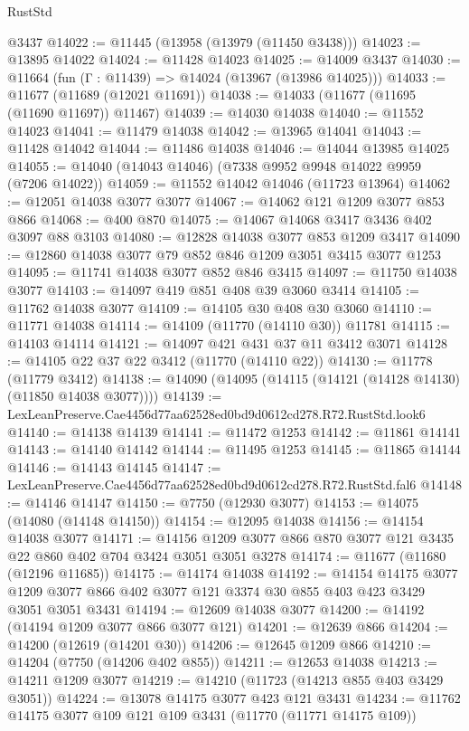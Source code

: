 \begin{lexlean}{RustStd}
\begin{coremodule}
    @3437
@14022 := @11445 (@13958 (@13979 (@11450 @3438)))
@14023 := @13895 @14022
@14024 := @11428 @14023
@14025 := @14009 @3437
@14030 := @11664 (fun (Γ : @11439) => @14024 (@13967 (@13986 @14025)))
@14033 := @11677 (@11689 (@12021 @11691))
@14038 := @14033 (@11677 (@11695 (@11690 @11697)) @11467)
@14039 := @14030 @14038
@14040 := @11552 @14023
@14041 := @11479 @14038
@14042 := @13965 @14041
@14043 := @11428 @14042
@14044 := @11486 @14038
@14046 := @14044 @13985 @14025
@14055 := @14040 (@14043 @14046) (@7338 @9952 @9948 @14022 @9959 (@7206 @14022))
@14059 := @11552 @14042 @14046 (@11723 @13964)
@14062 := @12051 @14038 @3077 @3077
@14067 := @14062 @121 @1209 @3077 @853 @866
@14068 := @400 @870
@14075 := @14067 @14068 @3417 @3436 @402 @3097 @88 @3103
@14080 := @12828 @14038 @3077 @853 @1209 @3417
@14090 := @12860 @14038 @3077 @79 @852 @846 @1209 @3051 @3415 @3077 @1253
@14095 := @11741 @14038 @3077 @852 @846 @3415
@14097 := @11750 @14038 @3077
@14103 := @14097 @419 @851 @408 @39 @3060 @3414
@14105 := @11762 @14038 @3077
@14109 := @14105 @30 @408 @30 @3060
@14110 := @11771 @14038
@14114 := @14109 (@11770 (@14110 @30)) @11781
@14115 := @14103 @14114
@14121 := @14097 @421 @431 @37 @11 @3412 @3071
@14128 := @14105 @22 @37 @22 @3412 (@11770 (@14110 @22))
@14130 := @11778 (@11779 @3412)
@14138 := @14090 (@14095 (@14115 (@14121 (@14128 @14130) (@11850 @14038 @3077))))
@14139 := LexLeanPreserve.Cae4456d77aa62528ed0bd9d0612cd278.R72.RustStd.look6
@14140 := @14138 @14139
@14141 := @11472 @1253
@14142 := @11861 @14141
@14143 := @14140 @14142
@14144 := @11495 @1253
@14145 := @11865 @14144
@14146 := @14143 @14145
@14147 := LexLeanPreserve.Cae4456d77aa62528ed0bd9d0612cd278.R72.RustStd.fal6
@14148 := @14146 @14147
@14150 := @7750 (@12930 @3077)
@14153 := @14075 (@14080 (@14148 @14150))
@14154 := @12095 @14038
@14156 := @14154 @14038 @3077
@14171 := @14156 @1209 @3077 @866 @870 @3077 @121 @3435 @22 @860 @402 @704 @3424 @3051 @3051 @3278
@14174 := @11677 (@11680 (@12196 @11685))
@14175 := @14174 @14038
@14192 := @14154
    @14175
    @3077
    @1209
    @3077
    @866
    @402
    @3077
    @121
    @3374
    @30
    @855
    @403
    @423
    @3429
    @3051
    @3051
    @3431
@14194 := @12609 @14038 @3077
@14200 := @14192 (@14194 @1209 @3077 @866 @3077 @121)
@14201 := @12639 @866
@14204 := @14200 (@12619 (@14201 @30))
@14206 := @12645 @1209 @866
@14210 := @14204 (@7750 (@14206 @402 @855))
@14211 := @12653 @14038
@14213 := @14211 @1209 @3077
@14219 := @14210 (@11723 (@14213 @855 @403 @3429 @3051))
@14224 := @13078 @14175 @3077 @423 @121 @3431
@14234 := @11762 @14175 @3077 @109 @121 @109 @3431 (@11770 (@11771 @14175 @109))

\end{coremodule}
\end{lexlean}
